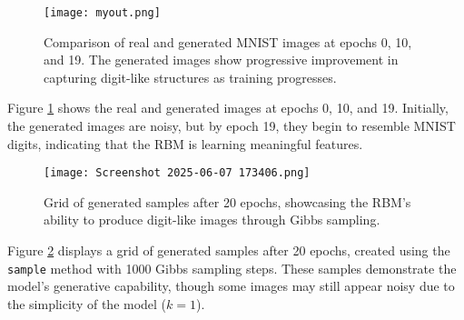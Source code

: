 \documentclass{article}
\begin{document}
\begin{figure}[h]
    \centering
    \texttt{[image: myout.png]}
    \caption{Comparison of real and generated MNIST images at epochs 0, 10, and 19. The generated images show progressive improvement in capturing digit-like structures as training progresses.}
    \label{fig:rbm_output}
\end{figure}


Figure \ref{fig:rbm_output} shows the real and generated images at epochs 0, 10, and 19. Initially, the generated images are noisy, but by epoch 19, they begin to resemble MNIST digits, indicating that the RBM is learning meaningful features.

\begin{figure}[h]
    \centering
    \texttt{[image: Screenshot 2025-06-07 173406.png]}
    \caption{Grid of generated samples after 20 epochs, showcasing the RBM's ability to produce digit-like images through Gibbs sampling.}
    \label{fig:generated_samples}
\end{figure}

Figure \ref{fig:generated_samples} displays a grid of generated samples after 20 epochs, created using the \texttt{sample} method with 1000 Gibbs sampling steps. These samples demonstrate the model's generative capability, though some images may still appear noisy due to the simplicity of the model (\( k=1 \)).
\end{document}
